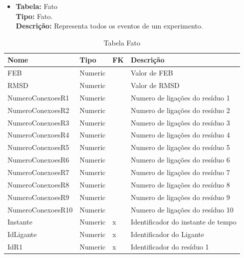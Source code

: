 \begin{itemize}
	\item
		\textbf{Tabela:} Fato \\
		\textbf{Tipo:} Fato. \\
		\textbf{Descrição:} Representa todos os eventos de um experimento.
\end{itemize}
\begin{table}[!htbp]
	\caption{Tabela Fato}
	\centering
	\begin{tabular}{@{}llll@{}}
	\toprule
	\textbf{Nome} & \textbf{Tipo} & \textbf{FK} & \textbf{Descrição}           				\\ \midrule
	FEB            			 & Numeric        &             & Valor de FEB			    \\
	RMSD    				 & Numeric        &             & Valor de RMSD          		\\
	NumeroConexoesR1 	     & Numeric        &             & Numero de ligações do resíduo 1   \\
	NumeroConexoesR2 	     & Numeric        &             & Numero de ligações do resíduo 2   \\
	NumeroConexoesR3 	     & Numeric        &             & Numero de ligações do resíduo 3   \\
	NumeroConexoesR4 	     & Numeric        &             & Numero de ligações do resíduo 4   \\
	NumeroConexoesR5 	     & Numeric        &             & Numero de ligações do resíduo 5   \\
	NumeroConexoesR6 	     & Numeric        &             & Numero de ligações do resíduo 6   \\
	NumeroConexoesR7 	     & Numeric        &             & Numero de ligações do resíduo 7   \\
	NumeroConexoesR8 	     & Numeric        &             & Numero de ligações do resíduo 8   \\
	NumeroConexoesR9 	     & Numeric        &             & Numero de ligações do resíduo 9   \\
	NumeroConexoesR10 	     & Numeric        &             & Numero de ligações do resíduo 10  \\
	Instante 	    		 & Numeric        &  x          & Identificador do instante de tempo  \\
	IdLigante 	    		 & Numeric        &  x          & Identificador do Ligante 			\\
	IdR1 				     & Numeric        &  x          & Identificador do resíduo 1   	\\

\end{tabular}
\end{table}

